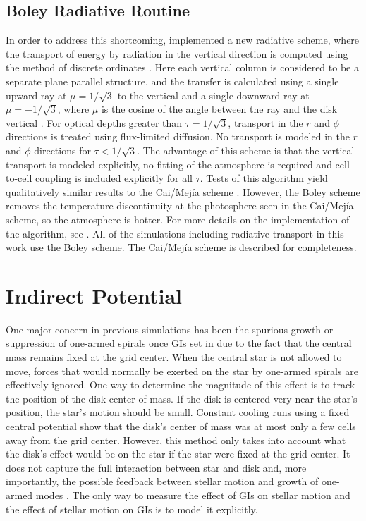 \subsection{Boley Radiative Routine}\label{sec:boleycooling}

In order to address this shortcoming, \citet{boley2007b} implemented a new radiative scheme, where the transport of energy by radiation in the vertical direction is computed using the method of discrete ordinates \citep{chandra1960}. Here each vertical column is considered to be a separate plane parallel structure, and the transfer is calculated using a single upward ray at $\mu = 1/\sqrt{3}$ to the vertical and a single downward ray at $\mu = -1/\sqrt{3}$, where $\mu$ is the cosine of the angle between the ray and the disk vertical . For optical depths greater than $\tau = 1/\sqrt{3}$, transport in the $r$ and $\phi$ directions is treated using flux-limited diffusion. No transport is modeled in the $r$ and $\phi$ directions for $\tau < 1/\sqrt{3}$. The advantage of this scheme is that the vertical transport is modeled explicitly, no fitting of the atmosphere is required and cell-to-cell coupling is included explicitly for all $\tau$. Tests of this algorithm yield qualitatively similar results to the Cai/Mej\'{i}a scheme \citep{boley2007b}. However, the Boley scheme removes the temperature discontinuity at the photosphere seen in the Cai/Mej\'{i}a scheme, so the atmosphere is hotter. For more details on the implementation of the algorithm, see \citet{boleyphd2007}. All of the simulations including radiative transport in this work use the Boley scheme. The Cai/Mej\'{i}a scheme is described for completeness.

\section{Indirect Potential} \label{sec:indirectpot}

One major concern in previous simulations has been the spurious growth or suppression of one-armed spirals once GIs set in due to the fact that the central mass remains fixed at the grid center. When the central star is not allowed to move, forces that would normally be exerted on the star by one-armed spirals are effectively ignored. One way to determine the magnitude of this effect is to track the position of the disk center of mass. If the disk is centered very near the star's position, the star's motion should be small. Constant cooling runs using a fixed central potential show that the disk's center of mass was at most only a few cells away from the grid center. However, this method only takes into account what the disk's effect would be on the star if the star were fixed at the grid center. It does not capture the full interaction between star and disk and, more importantly, the possible feedback between stellar motion and growth of one-armed modes \citep{adams1989,shu1990}. The only way to measure the effect of GIs on stellar motion and the effect of stellar motion on GIs is to model it explicitly.

